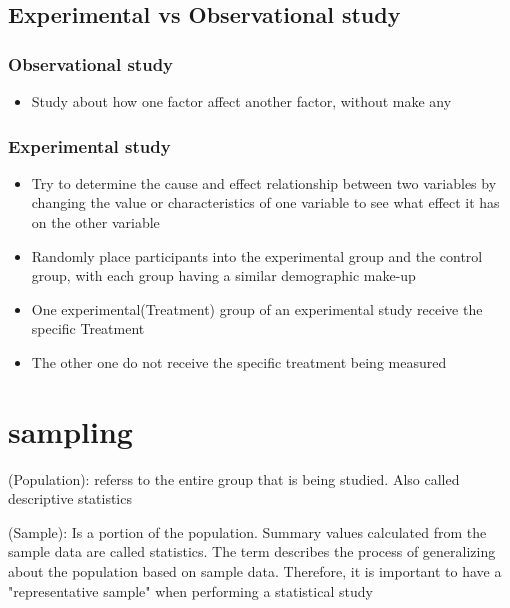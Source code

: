 \subsection{Experimental vs Observational study}
\subsubsection*{Observational study}
\begin{itemize}
    \item Study about how one factor affect another factor, without make any 
\end{itemize}

\subsubsection*{Experimental study}
\begin{itemize}
    \item Try to determine the cause and effect relationship between two variables by changing the 
    value or characteristics of one variable to see what effect it has on the other variable
    \item Randomly place participants into the experimental group and the control group, with each group having a similar demographic make-up
    \item One experimental(Treatment) group of an experimental study receive the specific Treatment
    \item The other one do not receive the specific treatment being measured
\end{itemize}

\section{sampling}
\begin{definition}
    (Population): referss to the entire group that is being studied. Also called descriptive statistics
\end{definition}
\begin{definition}
    (Sample): Is a portion of the population. Summary values calculated from the sample data are called statistics. 
    The term  describes the process of generalizing about the population based on 
    sample data. Therefore, it is important to have a "representative sample" when performing a statistical study
\end{definition}

